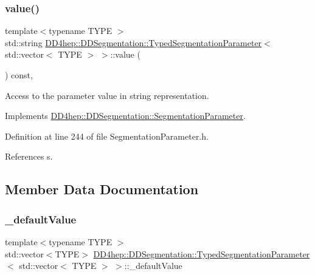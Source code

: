 \subsubsection{\texorpdfstring{value()}{value()}}
{\footnotesize\ttfamily template$<$typename T\+Y\+PE $>$ \\
std\+::string \hyperlink{class_d_d4hep_1_1_d_d_segmentation_1_1_typed_segmentation_parameter}{D\+D4hep\+::\+D\+D\+Segmentation\+::\+Typed\+Segmentation\+Parameter}$<$ std\+::vector$<$ T\+Y\+PE $>$ $>$\+::value (\begin{DoxyParamCaption}{ }\end{DoxyParamCaption}) const\hspace{0.3cm}{\ttfamily [inline]}, {\ttfamily [virtual]}}



Access to the parameter value in string representation. 



Implements \hyperlink{class_d_d4hep_1_1_d_d_segmentation_1_1_segmentation_parameter_a633dffe9e53306c5f67568ff5e567387}{D\+D4hep\+::\+D\+D\+Segmentation\+::\+Segmentation\+Parameter}.



Definition at line 244 of file Segmentation\+Parameter.\+h.



References s.



\subsection{Member Data Documentation}
\hypertarget{class_d_d4hep_1_1_d_d_segmentation_1_1_typed_segmentation_parameter_3_01std_1_1vector_3_01_t_y_p_e_01_4_01_4_a8756d0b27bf93d8e6d00a98d3038a1bd}{}\label{class_d_d4hep_1_1_d_d_segmentation_1_1_typed_segmentation_parameter_3_01std_1_1vector_3_01_t_y_p_e_01_4_01_4_a8756d0b27bf93d8e6d00a98d3038a1bd} 
\subsubsection{\texorpdfstring{\+\_\+default\+Value}{\_defaultValue}}
{\footnotesize\ttfamily template$<$typename T\+Y\+PE $>$ \\
std\+::vector$<$T\+Y\+PE$>$ \hyperlink{class_d_d4hep_1_1_d_d_segmentation_1_1_typed_segmentation_parameter}{D\+D4hep\+::\+D\+D\+Segmentation\+::\+Typed\+Segmentation\+Parameter}$<$ std\+::vector$<$ T\+Y\+PE $>$ $>$\+::\+\_\+default\+Value\hspace{0.3cm}{\ttfamily [protected]}}



